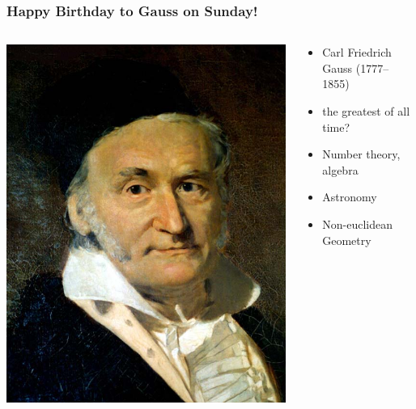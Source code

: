 \begin{frame}
  \frametitle{Happy Birthday to Gauss on Sunday!}

  \begin{columns}
    \begin{column}{.35\textwidth}
      \includegraphics[height=.6\textheight]{../assets/gauss}
    \end{column}
    \begin{column}{.7\textwidth}
      \begin{itemize}[<+->]
        \item Carl Friedrich Gauss (1777--1855)
                
        \item the greatest of all time?
        
           \item Number theory, algebra    

     \item Astronomy 
        
        \item Non-euclidean Geometry
        

\end{itemize}
\end{column}
\end{columns}
\end{frame}
